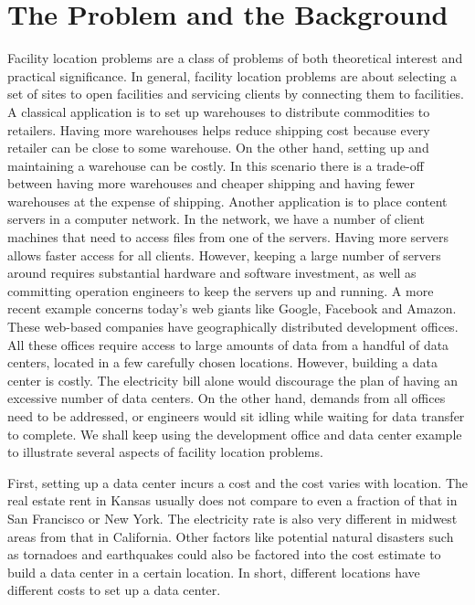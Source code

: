 \documentclass[oneside,final]{ucr}
\begin{document}
\section{The Problem and the Background}
Facility location problems are a class of problems of both
theoretical interest and practical significance. In general,
facility location problems are about selecting a set of
sites to open facilities and servicing clients by connecting
them to facilities. A classical application is to set up
warehouses to distribute commodities to retailers.  Having
more warehouses helps reduce shipping cost because every
retailer can be close to some warehouse. On the other hand,
setting up and maintaining a warehouse can be costly. In
this scenario there is a trade-off between having more
warehouses and cheaper shipping and having fewer warehouses
at the expense of shipping. Another application is to place
content servers in a computer network. In the network, we
have a number of client machines that need to access files
from one of the servers. Having more servers allows faster
access for all clients. However, keeping a large number of
servers around requires substantial hardware and software
investment, as well as committing operation engineers to
keep the servers up and running. A more recent example
concerns today's web giants like Google, Facebook and
Amazon. These web-based companies have geographically
distributed development offices. All these offices require
access to large amounts of data from a handful of data
centers, located in a few carefully chosen
locations. However, building a data center is costly. The
electricity bill alone would discourage the plan of having
an excessive number of data centers. On the other hand,
demands from all offices need to be addressed, or engineers
would sit idling while waiting for data transfer to
complete. We shall keep using the development office and
data center example to illustrate several aspects of
facility location problems.

First, setting up a data center incurs a cost and the cost
varies with location. The real estate rent in Kansas usually
does not compare to even a fraction of that in San Francisco
or New York. The electricity rate is also very different in
midwest areas from that in California. Other factors like
potential natural disasters such as tornadoes and
earthquakes could also be factored into the cost estimate to
build a data center in a certain location. In short,
different locations have different costs to set up a data
center.
\end{document}
